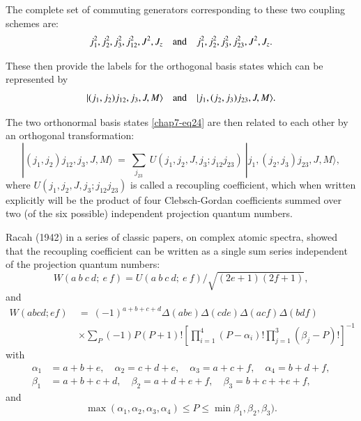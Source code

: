 The complete set of commuting generators corresponding to these two coupling schemes are:
\begin{equation}
j_1^2, j_2^2,j_3^2,j_{12}^2,J^2,J_z\quad {\rm and}\quad j_1^2, j_2^2,j_3^2,j_{23}^2,J^2,J_z. \label{chap7-eq23}
\end{equation}

These then provide the labels for the orthogonal basis states which can be represented by 
\begin{equation}
|(j_1,j_2)j_{12}, j_3, J, M\rangle  \quad {\rm and} \quad |j_1,(j_2,j_3)j_{23}, J, M\rangle. \label{chap7-eq24}
\end{equation}

The two orthonormal basis states \eqref{chap7-eq24} are then related to each other by an orthogonal transformation:
\begin{equation}
|(j_1,j_2)j_{12}, j_3, J, M\rangle \ =\ \sum_{j_{23}} \ U(j_1,j_2,J,j_3; j_{12}j_{23})\ |j_1,(j_2,j_3)j_{23}, J, M\rangle, \label{chap7-eq25}
\end{equation}
where $U(j_1,j_2,J,j_3; j_{12}j_{23})$ is called a recoupling coefficient, which when written explicitly will be the product of four Clebsch-Gordan coefficients summed over two (of the six possible) independent projection quantum numbers.

Racah (1942) in a series of classic papers, on complex atomic spectra, showed that the recoupling coefficient can be written as a single sum series independent of the projection quantum numbers:
\begin{equation}
W(a\ b\ c\ d;\ e\ f) =  U(a\ b\ c\ d;\ e\ f) / \sqrt{(2e+1)(2f+1)}, 
\end{equation}
and
\begin{equation}
\begin{split}
W(abcd;ef)\ & =\ (-1)^{a+b+c+d} \Delta(abe)\Delta(cde)\Delta(acf)\Delta(bdf) \\
 & \times\sum_P(-1)P (P+1)!\left[ \prod_{i=1}^4 (P-\alpha_i)! \prod_{j=1}^3 (\beta_j-P)! \right]^{-1} \label{chap7-eq25a}
\end{split}
\end{equation}
with
\begin{equation}
\begin{split}
\alpha_1 & = a+b+e,\quad \alpha_2 = c+d+e, \quad \alpha_3 = a+c+f,\quad \alpha_4 = b+d+f,\\
\beta_1 & = a+b+c+d,\quad \beta_2 = a+d+e+f, \quad \beta_3 = b+c++e+f, \label{chap7-eq26}
\end{split}
\end{equation}
and 
\begin{equation}
\max(\alpha_1,\alpha_2,\alpha_3,\alpha_4)\leq P\leq \min\beta_1,\beta_2,\beta_3). \label{chap7-eq27}
\end{equation}

